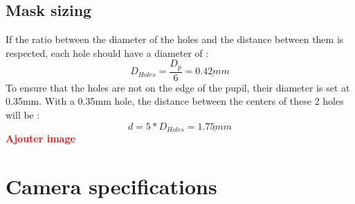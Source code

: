 \subsection{Mask sizing}
If the ratio between the diameter of the holes and the distance between them is respected, each hole should have a diameter of :
\begin{equation}\label{eq:Opti_ratio}
    D_{Holes} = \frac{D_p}{6} = \underline{0.42mm}
\end{equation}
To ensure that the holes are not on the edge of the pupil, their diameter is set at 0.35mm. With a 0.35mm hole, the distance
between the centers of these 2 holes will be :
\begin{equation}
    d = 5*D_{Holes} = \underline{1.75mm}
\end{equation}
\textbf{\textcolor{red}{Ajouter image}}
\section{Camera specifications}\label{sec:Opti_Cam}
